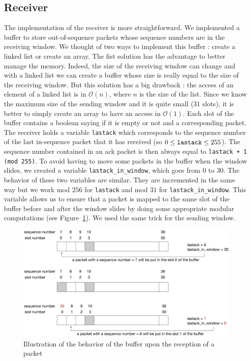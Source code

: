 \documentclass[10pt,a4paper]{article}
\begin{document}
\subsection{Receiver}
The implementation of the receiver is more straightforward. We implemented a buffer to store out-of-sequence packets whose sequence numbers are in the receiving window. We thought of two ways to implement this buffer : create a linked list or create an array. The fist solution has the advantage to better manage the memory. Indeed, the size of the receiving window can change and with a linked list we can create a buffer whose size is really equal to the size of the receiving window. But this solution has a big drawback : the access of an element of a linked list is in $\mathcal{O}(n)$, where $n$ is the size of the list. Since we know the maximum size of the sending window and it is quite small ($31$ slots), it is better to simply create an array to have an access in $\mathcal{O}(1)$. Each slot of the buffer contains a boolean saying if it is empty or not and a corresponding packet. The receiver holds a variable \texttt{lastack} which corresponds to the sequence number of the last in-sequence packet that it has received (so $0 \leq \text{\texttt{lastack}} \leq 255$). The sequence number contained in an ack packet is then always equal to \texttt{lastack + 1 (mod 255)}. To avoid having to move some packets in the buffer when the window slides, we created a variable \texttt{lastack\_in\_window}, which goes from $0$ to $30$. The behavior of these two variables are similar. They are incremented in the same way but we work mod $256$ for \texttt{lastack} and mod $31$ for \texttt{lastack\_in\_window}. This variable allows us to ensure that a packet is mapped to the same slot of the buffer before and after the window slides by doing some appropriate modular computations (see Figure~\ref{buffer}).  We used the same trick for the sending window.\\

\begin{figure}[!h]
	\begin{center}
		\includegraphics[width=15cm]{images/buffer.eps}
		\caption{Illustration of the behavior of the buffer upon the reception of a packet}
		\label{buffer}
	\end{center}
\end{figure}
\end{document}
